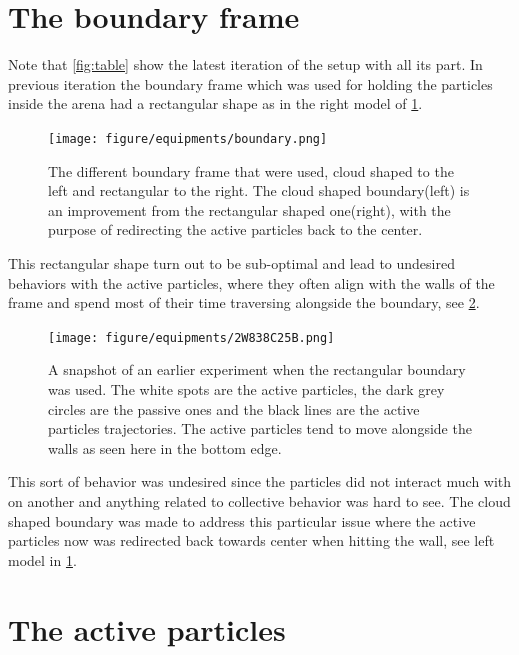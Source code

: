 \section{The boundary frame}

Note that \cref{fig:table} show the latest iteration of the setup with all its part. In previous iteration 
the boundary frame which was used for holding the particles inside the arena had a rectangular shape as 
in the right model of \cref{fig:boundary}.

\begin{figure}[htpb!]
    \centering
    \texttt{[image: figure/equipments/boundary.png]}
    \caption{The different boundary frame that were used, cloud shaped to the left and 
    rectangular to the right. The cloud shaped boundary(left) is an improvement from 
    the rectangular shaped one(right), with the purpose of redirecting the active particles 
    back to the center.}
    \label{fig:boundary}
\end{figure}

This rectangular shape turn out to be sub-optimal and lead to undesired behaviors with the active particles,  
where they often align with the walls of the frame and spend most of their time traversing alongside the boundary, see \cref{fig:walls}.


\begin{figure}[htpb!]
    \centering
    \texttt{[image: figure/equipments/2W838C25B.png]}
    \caption{A snapshot of an earlier experiment when the rectangular boundary was used. The white 
    spots are the active particles, the dark grey circles are the passive ones and the black lines 
    are the active particles trajectories. The active particles tend to move alongside the walls 
    as seen here in the bottom edge.}
    \label{fig:walls}
\end{figure}

This sort of behavior was undesired since the particles did not interact much with on another and 
anything related to collective behavior was hard to see. The cloud shaped boundary was made to 
address this particular issue where the active particles now was redirected back towards center 
when hitting the wall, see left model in \cref{fig:boundary}.

\section{The active particles}


